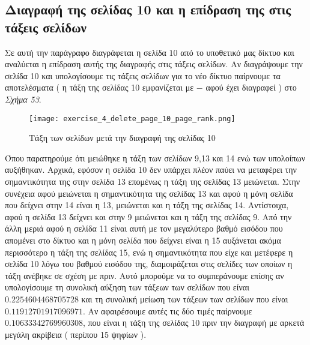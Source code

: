 \documentclass[First Project.tex]{subfiles}
\begin{document}
\subsection{ Διαγραφή της σελίδας 10 και η επίδραση της στις τάξεις σελίδων  }

Σε αυτή την παράγραφο διαγράφεται η σελίδα $10$ από το υποθετικό μας δίκτυο και αναλύεται η επίδραση αυτής της 
διαγραφής στις τάξεις σελίδων. Αν διαγράψουμε την σελίδα 10 και υπολογίσουμε τις τάξεις σελίδων για το νέο 
δίκτυο παίρνουμε τα αποτελέσματα ( η τάξη της σελίδας 10 εμφανίζεται με $-$ αφού έχει διαγραφεί ) στο 
\textit{Σχήμα 53}.

\begin{figure}[h!]
    \centering
    \captionsetup{justification=centering}
    \begin{center}
        \texttt{[image: exercise\_4\_delete\_page\_10\_page\_rank.png]}    
        \caption{ Τάξη των σελίδων μετά την διαγραφή της σελίδας 10 }
    \end{center}
\end{figure} 

\vspace{10mm}
Όπου παρατηρούμε ότι μειώθηκε η τάξη των σελίδων 9,13 και 14 ενώ των υπολοίπων αυξήθηκαν. Αρχικά, εφόσον η σελίδα
10 δεν υπάρχει πλέον παύει να μεταφέρει την σημαντικότητα της στην σελίδα 13 επομένως η τάξη της σελίδας 13
μειώνεται. Στην συνέχεια αφού μειώνεται η σημαντικότητα της σελίδας 13 και αφού η μόνη σελίδα που δείχνει στην 14 είναι
η 13, μειώνεται και η τάξη της σελίδας 14. Αντίστοιχα, αφού η σελίδα 13 δείχνει και στην 9 μειώνεται και η τάξη της 
σελίδας 9. Από την άλλη μεριά αφού η σελίδα 11 είναι αυτή με τον μεγαλύτερο βαθμό εισόδου που απομένει στο δίκτυο και η
μόνη σελίδα που δείχνει είναι η 15 αυξάνεται ακόμα περισσότερο η τάξη της σελίδας 15, ενώ η σημαντικότητα που είχε και
μετέφερε η σελίδα 10 λόγω του βαθμού εισόδου της, διαμοιράζεται στις σελίδες των οποίων η τάξη ανέβηκε σε σχέση με πριν.
Αυτό μπορούμε να το συμπεράνουμε επίσης αν υπολογίσουμε τη συνολική αύξηση των τάξεων των σελίδων που είναι
$0.2254604468705728$ και τη συνολική μείωση των τάξεων των σελίδων που είναι $0.11912701917096971$. Αν αφαιρέσουμε αυτές
τις δύο τιμές παίρνουμε $0.10633342769960308$, που είναι η τάξη της σελίδας 10 πριν την διαγραφή με αρκετά μεγάλη
ακρίβεια ( περίπου 15 ψηφίων ).
\end{document}
